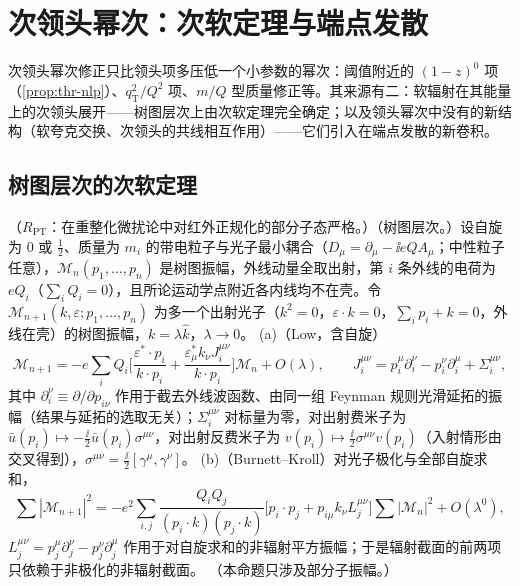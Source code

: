 \section{次领头幂次：次软定理与端点发散}\label{sec:power-nlp}

次领头幂次修正只比领头项多压低一个小参数的幂次：阈值附近的 $(1-z)^0$ 项（\cref{prop:thr-nlp}）、$q_{\mathrm T}^2/Q^2$ 项、$m/Q$ 型质量修正等。其来源有二：软辐射在其能量上的次领头展开——树图层次上由次软定理完全确定；以及领头幂次中没有的新结构（软夸克交换、次领头的共线相互作用）——它们引入在端点发散的新卷积。

\subsection{树图层次的次软定理}

\begin{proposition}\label{prop:power-next-to-soft}
（$R_{\mathrm{PT}}$：在重整化微扰论中对红外正规化的部分子态严格。）（树图层次。）设自旋为 0 或 $\frac12$、质量为 $m_i$ 的带电粒子与光子最小耦合（$D_\mu=\partial_\mu-\ii eQA_\mu$；中性粒子任意），$\mathcal M_n(p_1,\dots,p_n)$ 是树图振幅，外线动量全取出射，第 $i$ 条外线的电荷为 $eQ_i$（$\sum_iQ_i=0$），且所论运动学点附近各内线均不在壳。令 $\mathcal M_{n+1}(k,\varepsilon;p_1,\dots,p_n)$ 为多一个出射光子（$k^2=0$，$\varepsilon\cdot k=0$，$\sum_ip_i+k=0$，外线在壳）的树图振幅，$k=\lambda\hat k$，$\lambda\to0$。
(a)（Low，含自旋）
\begin{equation}\label{eq:power-lbk}
\mathcal M_{n+1}=-e\sum_iQ_i\Big[\frac{\varepsilon^*\!\cdot p_i}{k\cdot p_i}+\frac{\varepsilon^*_\mu k_\nu J_i^{\mu\nu}}{k\cdot p_i}\Big]\mathcal M_n+O(\lambda),\qquad
J_i^{\mu\nu}=p_i^\mu\partial_i^\nu-p_i^\nu\partial_i^\mu+\Sigma_i^{\mu\nu},
\end{equation}
其中 $\partial_i^\nu\equiv\partial/\partial p_{i\nu}$ 作用于截去外线波函数、由同一组 Feynman 规则光滑延拓的振幅（结果与延拓的选取无关）；$\Sigma_i^{\mu\nu}$ 对标量为零，对出射费米子为 $\bar u(p_i)\mapsto-\frac{\ii}{2}\bar u(p_i)\sigma^{\mu\nu}$，对出射反费米子为 $v(p_i)\mapsto\frac{\ii}{2}\sigma^{\mu\nu}v(p_i)$（入射情形由交叉得到），$\sigma^{\mu\nu}=\frac{\ii}{2}[\gamma^\mu,\gamma^\nu]$。
(b)（Burnett--Kroll）对光子极化与全部自旋求和，
\begin{equation}\label{eq:power-bk}
\sum|\mathcal M_{n+1}|^2=-e^2\sum_{i,j}\frac{Q_iQ_j}{(p_i\cdot k)(p_j\cdot k)}\Big[p_i\cdot p_j+p_{i\mu}k_\nu L_j^{\mu\nu}\Big]\sum|\mathcal M_n|^2+O(\lambda^0),
\end{equation}
$L_j^{\mu\nu}=p_j^\mu\partial_j^\nu-p_j^\nu\partial_j^\mu$ 作用于对自旋求和的非辐射平方振幅；于是辐射截面的前两项只依赖于非极化的非辐射截面。
（本命题只涉及部分子振幅。）
\end{proposition}

